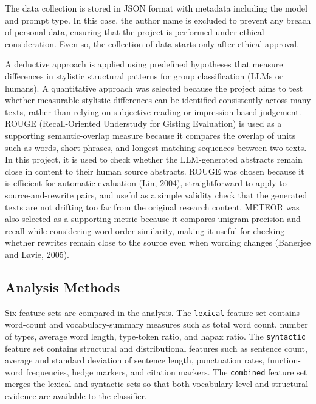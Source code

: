 \documentclass[12pt,a4paper]{article}
\begin{document}
The data collection is stored in JSON format with metadata including the model and prompt type. In this case, the author name is excluded to prevent any breach of personal data, ensuring that the project is performed under ethical consideration. Even so, the collection of data starts only after ethical approval.

A deductive approach is applied using predefined hypotheses that measure differences in stylistic structural patterns for group classification (LLMs or humans). A quantitative approach was selected because the project aims to test whether measurable stylistic differences can be identified consistently across many texts, rather than relying on subjective reading or impression-based judgement. ROUGE (Recall-Oriented Understudy for Gisting Evaluation) is used as a supporting semantic-overlap measure because it compares the overlap of units such as words, short phrases, and longest matching sequences between two texts. In this project, it is used to check whether the LLM-generated abstracts remain close in content to their human source abstracts. ROUGE was chosen because it is efficient for automatic evaluation (Lin, 2004), straightforward to apply to source-and-rewrite pairs, and useful as a simple validity check that the generated texts are not drifting too far from the original research content. METEOR was also selected as a supporting metric because it compares unigram precision and recall while considering word-order similarity, making it useful for checking whether rewrites remain close to the source even when wording changes (Banerjee and Lavie, 2005).

\subsection{Analysis Methods}

Six feature sets are compared in the analysis. The \texttt{lexical} feature set contains word-count and vocabulary-summary measures such as total word count, number of types, average word length, type-token ratio, and hapax ratio. The \texttt{syntactic} feature set contains structural and distributional features such as sentence count, average and standard deviation of sentence length, punctuation rates, function-word frequencies, hedge markers, and citation markers. The \texttt{combined} feature set merges the lexical and syntactic sets so that both vocabulary-level and structural evidence are available to the classifier.
\end{document}
